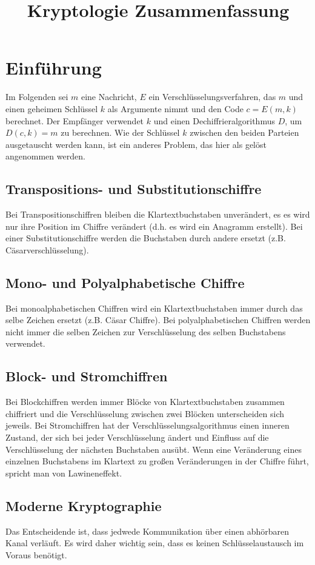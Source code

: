 \documentclass[a4paper, 12pt]{article}
\theoremstyle{plain}
\theoremstyle{definition}
\theoremstyle{lemma}
\theoremstyle{remark}
\theoremstyle{corollary}
\theoremstyle{example}
\begin{document}
	\begin{titlepage} 
		\title{Kryptologie Zusammenfassung}
		\clearpage\maketitle
		\thispagestyle{empty}
	\end{titlepage}
	\tableofcontents
	\newpage
	\section{Einführung}
	Im Folgenden sei $m$ eine Nachricht, $E$ ein Verschlüsselungsverfahren, das $m$ und einen geheimen Schlüssel $k$ als Argumente nimmt und den Code $c = E(m,k)$ berechnet. Der Empfänger verwendet $k$ und einen Dechiffrieralgorithmus $D$, um $D(c,k) = m$ zu berechnen. Wie der Schlüssel $k$ zwischen den beiden Parteien ausgetauscht werden kann, ist ein anderes Problem, das hier als gelöst angenommen werden.
	\subsection{Transpositions- und Substitutionschiffre}
	Bei Transpositionschiffren bleiben die Klartextbuchstaben unverändert, es es wird nur ihre Position im Chiffre verändert (d.h. es wird ein Anagramm erstellt). Bei einer Substitutionschiffre werden die Buchstaben durch andere ersetzt (z.B. Cäsarverschlüsselung).
	\subsection{Mono- und Polyalphabetische Chiffre}
	Bei monoalphabetischen Chiffren wird ein Klartextbuchstaben immer durch das selbe Zeichen ersetzt (z.B. Cäsar Chiffre). Bei polyalphabetischen Chiffren werden nicht immer die selben Zeichen zur Verschlüsselung des selben Buchstabens verwendet.
	\subsection{Block- und Stromchiffren}
	Bei Blockchiffren werden immer Blöcke von Klartextbuchstaben zusammen chiffriert und die Verschlüsselung zwischen zwei Blöcken unterscheiden sich jeweils. Bei Stromchiffren hat der Verschlüsselungsalgorithmus einen inneren Zustand, der sich bei jeder Verschlüsselung ändert und Einfluss auf die Verschlüsselung der nächsten Buchstaben ausübt. Wenn eine Veränderung eines einzelnen Buchstabens im Klartext zu großen Veränderungen in der Chiffre führt, spricht man von Lawineneffekt.
	\subsection{Moderne Kryptographie}
	Das Entscheidende ist, dass jedwede Kommunikation über einen abhörbaren Kanal verläuft. Es wird daher wichtig sein, dass es keinen Schlüsselaustausch im Voraus benötigt.
\end{document}
